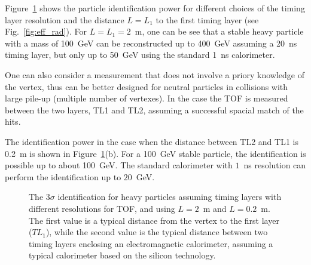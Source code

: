 Figure~\ref{fig:signgleBSM} shows the particle identification power for different choices of the timing layer resolution
and the distance $L=L_1$ to the first timing layer (see Fig.~\ref{fig:eff_rad}).
For $L=L_1=2$~m, one can be see that a stable heavy particle with a mass of 100~GeV can be reconstructed up to 
400~GeV assuming a 20~ns timing layer,
but only up to 50~GeV using the standard 1~ns calorimeter.

One can also consider a  measurement that does not involve a priory knowledge  of the vertex, thus can be better
designed for neutral particles in collisions with large pile-up (multiple number of vertexes).  
In the case the TOF is measured between the two layers, TL1 and TL2, assuming a successful spacial match of the hits.

The identification power in the case when the distance between TL2 and TL1 is 0.2~m is shown in Figure~\ref{fig:signgleBSM}(b).
For a 100~GeV stable particle, the identification is possible up to about 100~GeV. The standard calorimeter with
$1$~ns resolution can perform the identification up to $20$~GeV. 

\begin{figure}
\begin{center}
\end{center}
\caption{
The $3\sigma$ identification for heavy particles assuming timing layers with different resolutions for TOF, and using $L=2$~m and $L=0.2$~m.
The first value is a typical distance
from the vertex to the first layer ($TL_1$), while the second value is the typical  distance 
between two timing layers enclosing an electromagnetic calorimeter, assuming a typical calorimeter 
based on the silicon technology. 
}
\label{fig:signgleBSM}
\end{figure}


   
 
 


   
 





